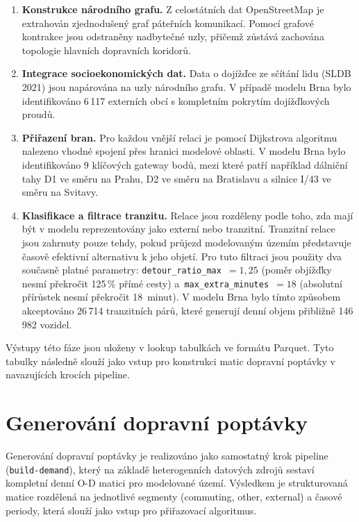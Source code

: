 \begin{enumerate}
    \item \textbf{Konstrukce národního grafu.} Z celostátních dat OpenStreetMap je extrahován zjednodušený graf páteřních komunikací. Pomocí grafové kontrakce jsou odstraněny nadbytečné uzly, přičemž zůstává zachována topologie hlavních dopravních koridorů.

    \item \textbf{Integrace socioekonomických dat.} Data o dojížďce ze sčítání lidu (SLDB 2021) jsou napárována na uzly národního grafu. V případě modelu Brna bylo identifikováno 6\,117 externích obcí s kompletním pokrytím dojížďkových proudů.

    \item \textbf{Přiřazení bran.} Pro každou vnější relaci je pomocí Dijkstrova algoritmu nalezeno vhodné spojení přes hranici modelové oblasti. V modelu Brna bylo identifikováno 9 klíčových gateway bodů, mezi které patří například dálniční tahy D1 ve směru na Prahu, D2 ve směru na Bratislavu a silnice I/43 ve směru na Svitavy.

    \item \textbf{Klasifikace a filtrace tranzitu.} Relace jsou rozděleny podle toho, zda mají být v modelu reprezentovány jako externí nebo tranzitní. Tranzitní relace jsou zahrnuty pouze tehdy, pokud průjezd modelovaným územím představuje časově efektivní alternativu k jeho objetí. Pro tuto filtraci jsou použity dva současně platné parametry: \texttt{detour\_ratio\_max}~$= 1{,}25$ (poměr objížďky nesmí překročit 125\,\% přímé cesty) a~\texttt{max\_extra\_minutes}~$= 18$ (absolutní přírůstek nesmí překročit 18~minut). V modelu Brna bylo tímto způsobem akceptováno 26\,714 tranzitních párů, které generují denní objem přibližně 146\,982 vozidel.
\end{enumerate}

Výstupy této fáze jsou uloženy v lookup tabulkách ve formátu Parquet. Tyto tabulky následně slouží jako vstup pro konstrukci matic dopravní poptávky v navazujících krocích pipeline.


\section{Generování dopravní poptávky}
\label{sec:impl-demand}

Generování dopravní poptávky je realizováno jako samostatný krok pipeline (\texttt{build-demand}), který na základě heterogenních datových zdrojů sestaví kompletní denní O-D matici pro modelované území. Výsledkem je strukturovaná matice rozdělená na jednotlivé segmenty (commuting, other, external) a časové periody, která slouží jako vstup pro přiřazovací algoritmus.

